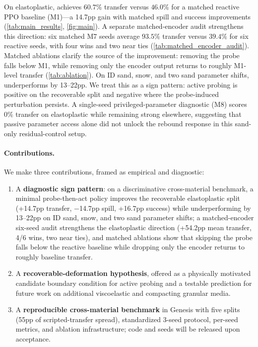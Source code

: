 On elastoplastic, \PTA{} achieves $60.7$\% transfer versus $46.0$\% for a matched reactive PPO baseline (M1)---a 14.7pp gain with matched spill and success improvements (\cref{tab:main_results}, \cref{fig:main}). A separate matched-encoder audit strengthens this direction: six matched M7 seeds average $93.5$\% transfer versus $39.4$\% for six reactive seeds, with four wins and two near ties (\cref{tab:matched_encoder_audit}). Matched ablations clarify the source of the improvement: removing the probe falls below M1, while removing only the encoder output returns to roughly M1-level transfer (\cref{tab:ablation}). On ID sand, snow, and two sand parameter shifts, \PTA{} underperforms by 13--22pp. We treat this as a sign pattern: active probing is positive on the recoverable split and negative where the probe-induced perturbation persists. A single-seed privileged-parameter diagnostic (M8) scores 0\% transfer on elastoplastic while remaining strong elsewhere, suggesting that passive parameter access alone did not unlock the rebound response in this sand-only residual-control setup.

\paragraph{Contributions.} We make three contributions, framed as empirical and diagnostic:
\begin{enumerate}
    \item A \textbf{diagnostic sign pattern}: on a discriminative cross-material benchmark, a minimal probe-then-act policy improves the recoverable elastoplastic split (+14.7pp transfer, $-$14.7pp spill, +16.7pp success) while underperforming by 13--22pp on ID sand, snow, and two sand parameter shifts; a matched-encoder six-seed audit strengthens the elastoplastic direction (+54.2pp mean transfer, 4/6 wins, two near ties), and matched ablations show that skipping the probe falls below the reactive baseline while dropping only the encoder returns to roughly baseline transfer.
    \item A \textbf{recoverable-deformation hypothesis}, offered as a physically motivated candidate boundary condition for active probing and a testable prediction for future work on additional viscoelastic and compacting granular media.
    \item A \textbf{reproducible cross-material benchmark} in Genesis with five splits (55pp of scripted-transfer spread), standardized 3-seed protocol, per-seed metrics, and ablation infrastructure; code and seeds will be released upon acceptance.
\end{enumerate}

